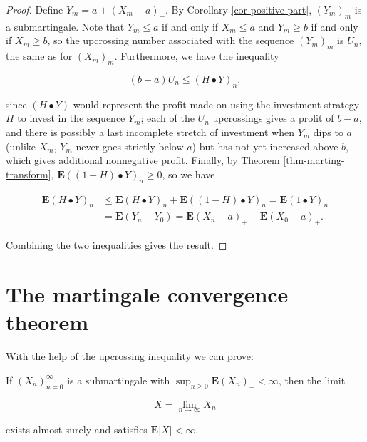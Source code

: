 \begin{proof}
Define $Y_m = a+(X_m-a)_+$. By Corollary
\ref{cor-positive-part}, $(Y_m)_m$ is a submartingale.
Note that $Y_m\le a$ if and only if $X_m\le a$ and
$Y_m\ge b$ if and only if $X_m\ge b$, so the
upcrossing number associated with the sequence
$(Y_m)_m$ is $U_n$, the same as for $(X_m)_m$.
Furthermore, we have the inequality

\[
(b-a)U_n \le (H\bullet Y)_n,
\]

\noindent since $(H\bullet Y)$ would represent the profit made
on using the investment strategy $H$ to invest in the
sequence $Y_m$; each of the $U_n$ upcrossings gives a
profit of $b-a$, and there is possibly a last
incomplete stretch of investment when $Y_m$ dips to
$a$ (unlike $X_m$, $Y_m$ never goes strictly below
$a$) but has not yet increased above $b$, which gives
additional nonnegative profit. Finally, by Theorem
\ref{thm-marting-transform},
$\mathbf{E}((1-H)\bullet Y)_n\ge 0$, so we have

\begin{align*}
\mathbf{E}(H\bullet Y)_n &\le \mathbf{E}(H\bullet Y)_n + \mathbf{E}((1-H)\bullet Y)_n = \mathbf{E}(1\bullet Y)_n \\ &= \mathbf{E}(Y_n-Y_0) = \mathbf{E}(X_n-a)_+ - \mathbf{E}(X_0-a)_+.
\end{align*}

\noindent Combining the two inequalities gives the result.
\end{proof}

\section{The martingale convergence theorem}
With the help of the upcrossing inequality we can
prove:

\begin{thm}
If $(X_n)_{n=0}^\infty$ is a submartingale with
$\sup_{n\ge 0}\mathbf{E} (X_n)_+ < \infty$, then the
limit

\[
X = \lim_{n\to\infty} X_n
\]

\noindent exists almost surely and satisfies
$\mathbf{E}|X|<\infty$.
\end{thm}

